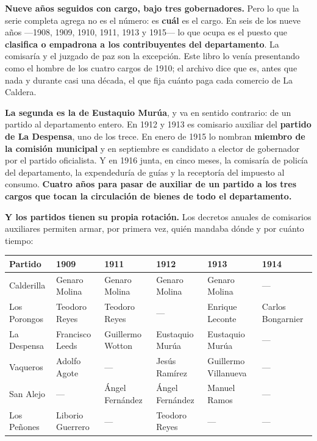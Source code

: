 \textbf{Nueve años seguidos con cargo, bajo tres gobernadores.} Pero lo que la serie completa agrega no
es el número: es \textbf{cuál} es el cargo. En seis de los nueve años ---1908, 1909, 1910, 1911, 1913 y
1915--- lo que ocupa es el puesto que \textbf{clasifica o empadrona a los contribuyentes del
departamento}. La comisaría y el juzgado de paz son la excepción. Este libro lo venía presentando como
el hombre de los cuatro cargos de 1910; el archivo dice que es, antes que nada y durante casi una
década, el que fija cuánto paga cada comercio de La Caldera.

\textbf{La segunda es la de Eustaquio Murúa}, y va en sentido contrario: de un
partido al departamento entero. En 1912 y 1913 es comisario auxiliar del \textbf{partido de La
Despensa}, uno de los trece. En enero de 1915 lo nombran \textbf{miembro de la comisión municipal} y en
septiembre es candidato a elector de gobernador por el partido oficialista. Y en 1916 junta, en cinco
meses, la comisaría de policía del departamento, la expendeduría de guías y la receptoría del impuesto
al consumo. \textbf{Cuatro años para pasar de auxiliar de un partido a los tres cargos que tocan la
circulación de bienes de todo el departamento.}

\textbf{Y los partidos tienen su propia rotación.} Los decretos anuales de comisarios auxiliares
permiten armar, por primera vez, quién mandaba dónde y por cuánto tiempo:

{\footnotesize
\begin{longtable}{@{}p{1.9cm}p{1.95cm}p{1.95cm}p{1.95cm}p{1.95cm}p{1.8cm}@{}}
\toprule
\textbf{Partido} & \textbf{1909} & \textbf{1911} & \textbf{1912} & \textbf{1913} & \textbf{1914} \\
\midrule
\endhead
Calderilla & Genaro Molina & Genaro Molina & Genaro Molina & Genaro Molina & --- \\
\addlinespace
Los Porongos & Teodoro Reyes & Teodoro Reyes & --- & Enrique Leconte & Carlos Bongarnier \\
\addlinespace
La Despensa & Francisco Leeds & Guillermo Wotton & Eustaquio Murúa\index{Murúa, Eustaquio} & Eustaquio Murúa\index{Murúa, Eustaquio} & --- \\
\addlinespace
Vaqueros & Adolfo Agote & --- & Jesús Ramírez & Guillermo Villanueva & --- \\
\addlinespace
San Alejo & --- & Ángel Fernández\index{Fernández, Ángel} & Ángel Fernández\index{Fernández, Ángel} & Manuel Ramos & --- \\
\addlinespace
Los Peñones & Liborio Guerrero & --- & Teodoro Reyes & --- & --- \\
\bottomrule
\end{longtable}
}

